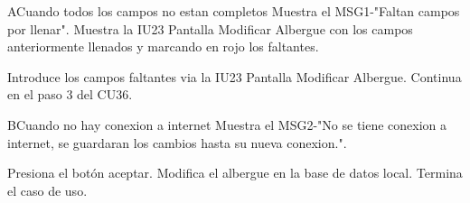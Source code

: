 \begin{UCtrayectoriaA}{A}{Cuando todos los campos no estan completos}
	\UCpaso Muestra el MSG1-"Faltan campos por llenar".
	\UCpaso Muestra la IU23 Pantalla Modificar Albergue con los campos anteriormente llenados y marcando en rojo los faltantes.
	\item\UCactor Introduce los campos faltantes via la IU23 Pantalla Modificar Albergue.
	\UCpaso Continua en el paso 3 del CU36.
\end{UCtrayectoriaA}

\begin{UCtrayectoriaA}{B}{Cuando no hay conexion a internet}
	\UCpaso Muestra el MSG2-"No se tiene conexion a internet, se guardaran los cambios hasta su nueva conexion.".
	\item\UCactor Presiona el botón aceptar.
	\UCpaso Modifica el albergue en la base de datos local.	
	\UCpaso[] Termina el caso de uso.
\end{UCtrayectoriaA}